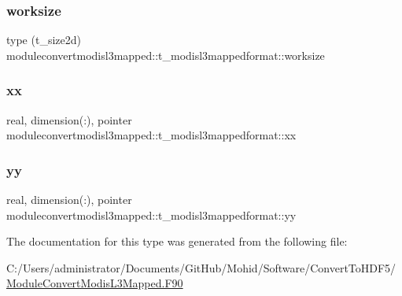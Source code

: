 \subsubsection{\texorpdfstring{worksize}{worksize}}
{\footnotesize\ttfamily type (t\+\_\+size2d) moduleconvertmodisl3mapped\+::t\+\_\+modisl3mappedformat\+::worksize\hspace{0.3cm}{\ttfamily [private]}}

\mbox{\label{structmoduleconvertmodisl3mapped_1_1t__modisl3mappedformat_ab2959305cdeda86ede16c9c6830a6c52}} 
\subsubsection{\texorpdfstring{xx}{xx}}
{\footnotesize\ttfamily real, dimension(\+:), pointer moduleconvertmodisl3mapped\+::t\+\_\+modisl3mappedformat\+::xx\hspace{0.3cm}{\ttfamily [private]}}

\mbox{\label{structmoduleconvertmodisl3mapped_1_1t__modisl3mappedformat_a801c2b5598b913d0330107662465fe7e}} 
\subsubsection{\texorpdfstring{yy}{yy}}
{\footnotesize\ttfamily real, dimension(\+:), pointer moduleconvertmodisl3mapped\+::t\+\_\+modisl3mappedformat\+::yy\hspace{0.3cm}{\ttfamily [private]}}



The documentation for this type was generated from the following file\+:\begin{DoxyCompactItemize}
\item 
C\+:/\+Users/administrator/\+Documents/\+Git\+Hub/\+Mohid/\+Software/\+Convert\+To\+H\+D\+F5/\mbox{\hyperlink{_module_convert_modis_l3_mapped_8_f90}{Module\+Convert\+Modis\+L3\+Mapped.\+F90}}\end{DoxyCompactItemize}
